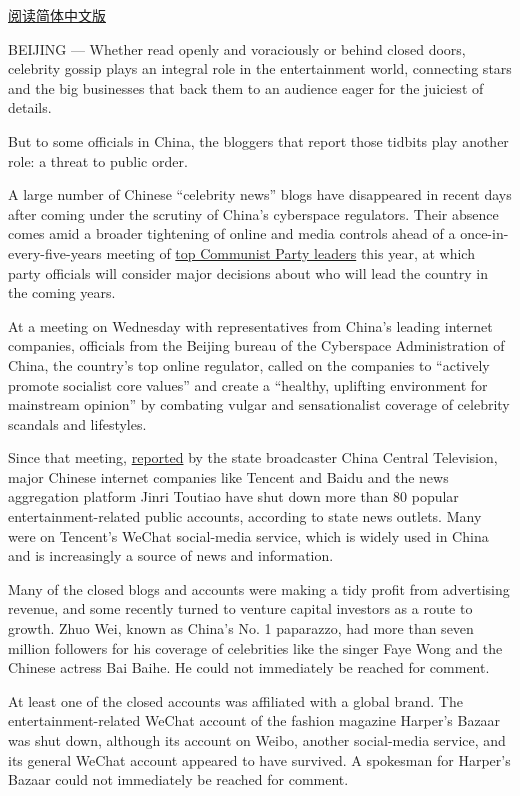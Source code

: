 \href{https://cn.nytimes.com/china/20170612/china-celebrity-news-wechat/}{阅读简体中文版}

BEIJING --- Whether read openly and voraciously or behind closed doors,
celebrity gossip plays an integral role in the entertainment world,
connecting stars and the big businesses that back them to an audience
eager for the juiciest of details.

But to some officials in China, the bloggers that report those tidbits
play another role: a threat to public order.

A large number of Chinese ``celebrity news'' blogs have disappeared in
recent days after coming under the scrutiny of China's cyberspace
regulators. Their absence comes amid a broader tightening of online and
media controls ahead of a once-in-every-five-years meeting of
\href{https://www.nytimes.com/2016/10/05/world/asia/china-president-xi-jinping-successor.html}{top
Communist Party leaders} this year, at which party officials will
consider major decisions about who will lead the country in the coming
years.

At a meeting on Wednesday with representatives from China's leading
internet companies, officials from the Beijing bureau of the Cyberspace
Administration of China, the country's top online regulator, called on
the companies to ``actively promote socialist core values'' and create a
``healthy, uplifting environment for mainstream opinion'' by combating
vulgar and sensationalist coverage of celebrity scandals and lifestyles.

Since that meeting,
\href{http://news.xinhuanet.com/politics/2017-06/07/c_1121104271.htm}{reported}
by the state broadcaster China Central Television, major Chinese
internet companies like Tencent and Baidu and the news aggregation
platform Jinri Toutiao have shut down more than 80 popular
entertainment-related public accounts, according to state news outlets.
Many were on Tencent's WeChat social-media service, which is widely used
in China and is increasingly a source of news and information.

Many of the closed blogs and accounts were making a tidy profit from
advertising revenue, and some recently turned to venture capital
investors as a route to growth. Zhuo Wei, known as China's No. 1
paparazzo, had more than seven million followers for his coverage of
celebrities like the singer Faye Wong and the Chinese actress Bai Baihe.
He could not immediately be reached for comment.

At least one of the closed accounts was affiliated with a global brand.
The entertainment-related WeChat account of the fashion magazine
Harper's Bazaar was shut down, although its account on Weibo, another
social-media service, and its general WeChat account appeared to have
survived. A spokesman for Harper's Bazaar could not immediately be
reached for comment.

